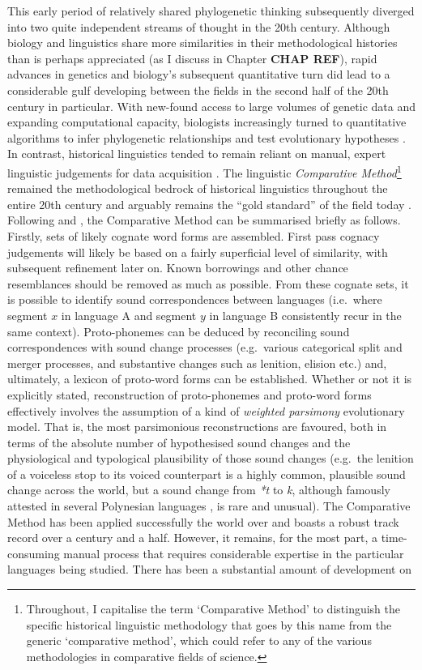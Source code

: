 This early period of relatively shared phylogenetic thinking subsequently diverged into two quite independent streams of thought in the 20th century. Although biology and linguistics share more similarities in their methodological histories than is perhaps appreciated (as I discuss in Chapter \textbf{CHAP REF}), rapid advances in genetics and biology's subsequent quantitative turn did lead to a considerable gulf developing between the fields in the second half of the 20th century in particular. With new-found access to large volumes of genetic data and expanding computational capacity, biologists increasingly turned to quantitative algorithms to infer phylogenetic relationships and test evolutionary hypotheses \autocite{atkinson_curious_2005}. In contrast, historical linguistics tended to remain reliant on manual, expert linguistic judgements for data acquisition \autocite{nunn_comparative_2011}. The linguistic \emph{Comparative Method}\footnote{Throughout, I capitalise the term `Comparative Method' to distinguish the specific historical linguistic methodology that goes by this name from the generic `comparative method', which could refer to any of the various methodologies in comparative fields of science.} remained the methodological bedrock of historical linguistics throughout the entire 20th century and arguably remains the ``gold standard'' of the field today \autocite[p.~712]{dunn_structural_2008}. Following \textcite{thomason_language_1988} and \textcite{campbell_historical_2004}, the Comparative Method can be summarised briefly as follows. Firstly, sets of likely cognate word forms are assembled. First pass cognacy judgements will likely be based on a fairly superficial level of similarity, with subsequent refinement later on. Known borrowings and other chance resemblances should be removed as much as possible. From these cognate sets, it is possible to identify sound correspondences between languages (i.e.~where segment \(x\) in language A and segment \(y\) in language B consistently recur in the same context). Proto-phonemes can be deduced by reconciling sound correspondences with sound change processes (e.g.~various categorical split and merger processes, and substantive changes such as lenition, elision etc.) and, ultimately, a lexicon of proto-word forms can be established. Whether or not it is explicitly stated, reconstruction of proto-phonemes and proto-word forms effectively involves the assumption of a kind of \emph{weighted parsimony} evolutionary model. That is, the most parsimonious reconstructions are favoured, both in terms of the absolute number of hypothesised sound changes and the physiological and typological plausibility of those sound changes (e.g.~the lenition of a voiceless stop to its voiced counterpart is a highly common, plausible sound change across the world, but a sound change from \emph{*t} to \emph{k}, although famously attested in several Polynesian languages \autocite{blust_t_2004}, is rare and unusual). The Comparative Method has been applied successfully the world over and boasts a robust track record over a century and a half. However, it remains, for the most part, a time-consuming manual process that requires considerable expertise in the particular languages being studied. There has been a substantial amount of development on 